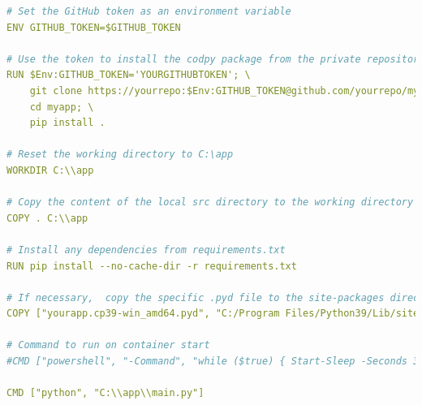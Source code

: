 \documentclass{article}
\begin{document}
\begin{lstlisting}[language=yaml]
# Set the GitHub token as an environment variable
ENV GITHUB_TOKEN=$GITHUB_TOKEN

# Use the token to install the codpy package from the private repository
RUN $Env:GITHUB_TOKEN='YOURGITHUBTOKEN'; \
    git clone https://yourrepo:$Env:GITHUB_TOKEN@github.com/yourrepo/myapp.git; \
    cd myapp; \
    pip install .

# Reset the working directory to C:\app
WORKDIR C:\\app

# Copy the content of the local src directory to the working directory
COPY . C:\\app

# Install any dependencies from requirements.txt
RUN pip install --no-cache-dir -r requirements.txt

# If necessary,  copy the specific .pyd file to the site-packages directory
COPY ["yourapp.cp39-win_amd64.pyd", "C:/Program Files/Python39/Lib/site-packages/"]

# Command to run on container start
#CMD ["powershell", "-Command", "while ($true) { Start-Sleep -Seconds 3600 }"]

CMD ["python", "C:\\app\\main.py"]
\end{lstlisting}
\end{document}
